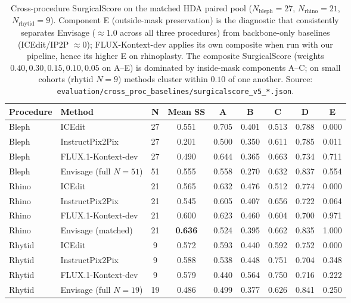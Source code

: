 \documentclass{article}
\newcommand{\method}{Envisage}
\newcommand{\best}[1]{\textbf{#1}}
\begin{document}
\begin{table}[h]
\centering
\small
\caption{Cross-procedure SurgicalScore on the matched HDA paired pool
($N_\text{bleph}{=}27$, $N_\text{rhino}{=}21$, $N_\text{rhytid}{=}9$).
Component E (outside-mask preservation) is the diagnostic that consistently
separates \method{} ($\approx 1.0$ across all three procedures) from
backbone-only baselines (ICEdit/IP2P $\approx 0$); FLUX-Kontext-dev applies
its own composite when run with our pipeline, hence its higher E on rhinoplasty.
The composite SurgicalScore (weights $0.40, 0.30, 0.15, 0.10, 0.05$ on A--E)
is dominated by inside-mask components A--C; on small cohorts (rhytid $N{=}9$)
methods cluster within $0.10$ of one another. Source:
\texttt{evaluation/cross\_proc\_baselines/surgicalscore\_v5\_*.json}.}
\label{tab:cross_proc_baselines}
\begin{tabular}{@{}llccccccc@{}}
\toprule
\textbf{Procedure} & \textbf{Method} & \textbf{N} & \textbf{Mean SS} &
\textbf{A} & \textbf{B} & \textbf{C} & \textbf{D} & \textbf{E} \\
\midrule
Bleph & ICEdit            & 27 & 0.551 & 0.705 & 0.401 & 0.513 & 0.788 & 0.000 \\
Bleph & InstructPix2Pix   & 27 & 0.201 & 0.500 & 0.350 & 0.611 & 0.785 & 0.011 \\
Bleph & FLUX.1-Kontext-dev & 27 & 0.490 & 0.644 & 0.365 & 0.663 & 0.734 & 0.711 \\
Bleph & \method{} (full $N{=}51$) & 51 & 0.555 & 0.558 & 0.270 & 0.632 & 0.837 & 0.554 \\
\midrule
Rhino & ICEdit            & 21 & 0.565 & 0.632 & 0.476 & 0.512 & 0.774 & 0.000 \\
Rhino & InstructPix2Pix   & 21 & 0.545 & 0.605 & 0.407 & 0.656 & 0.722 & 0.064 \\
Rhino & FLUX.1-Kontext-dev & 21 & 0.600 & 0.623 & 0.460 & 0.604 & 0.700 & 0.971 \\
Rhino & \method{} (matched)  & 21 & \best{0.636} & 0.524 & 0.395 & 0.662 & 0.835 & 1.000 \\
\midrule
Rhytid & ICEdit            & 9  & 0.572 & 0.593 & 0.440 & 0.592 & 0.752 & 0.000 \\
Rhytid & InstructPix2Pix   & 9  & 0.588 & 0.538 & 0.448 & 0.751 & 0.704 & 0.348 \\
Rhytid & FLUX.1-Kontext-dev & 9  & 0.579 & 0.440 & 0.564 & 0.750 & 0.716 & 0.222 \\
Rhytid & \method{} (full $N{=}19$) & 19 & 0.486 & 0.499 & 0.377 & 0.626 & 0.841 & 0.250 \\
\bottomrule
\end{tabular}
\end{table}
\end{document}
